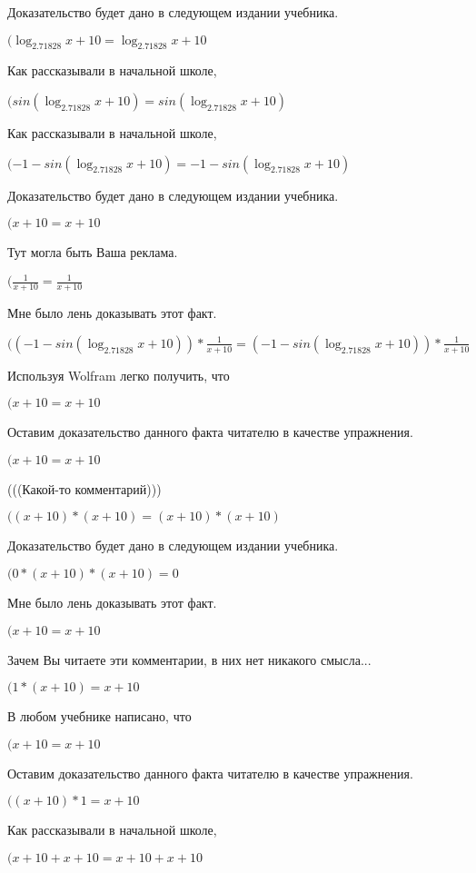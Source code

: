 \documentclass[12pt,a4paper,fleqn]{article}
\theoremstyle{definition}
\begin{document}
Доказательство будет дано в следующем издании учебника.

$(\log_{ 2.71828 }{ x  +  10 } = \log_{ 2.71828 }{ x  +  10 }$

Как рассказывали в начальной школе,

$(sin(\log_{ 2.71828 }{ x  +  10 }) = sin(\log_{ 2.71828 }{ x  +  10 })$

Как рассказывали в начальной школе,

$( -1  - sin(\log_{ 2.71828 }{ x  +  10 }) =  -1  - sin(\log_{ 2.71828 }{ x  +  10 })$

Доказательство будет дано в следующем издании учебника.

$( x  +  10  =  x  +  10 $

Тут могла быть Ваша реклама.

$(\frac{ 1 }{ x  +  10 }
 = \frac{ 1 }{ x  +  10 }
$

Мне было лень доказывать этот факт.

$(( -1  - sin(\log_{ 2.71828 }{ x  +  10 })) * \frac{ 1 }{ x  +  10 }
 = ( -1  - sin(\log_{ 2.71828 }{ x  +  10 })) * \frac{ 1 }{ x  +  10 }
$

Используя Wolfram легко получить, что

$( x  +  10  =  x  +  10 $

Оставим доказательство данного факта читателю в качестве упражнения.

$( x  +  10  =  x  +  10 $

(((Какой-то комментарий)))

$(( x  +  10 ) * ( x  +  10 ) = ( x  +  10 ) * ( x  +  10 )$

Доказательство будет дано в следующем издании учебника.

$( 0  * ( x  +  10 ) * ( x  +  10 ) =  0 $

Мне было лень доказывать этот факт.

$( x  +  10  =  x  +  10 $

Зачем Вы читаете эти комментарии, в них нет никакого смысла...

$( 1  * ( x  +  10 ) =  x  +  10 $

В любом учебнике написано, что

$( x  +  10  =  x  +  10 $

Оставим доказательство данного факта читателю в качестве упражнения.

$(( x  +  10 ) *  1  =  x  +  10 $

Как рассказывали в начальной школе,

$( x  +  10  +  x  +  10  =  x  +  10  +  x  +  10 $
\end{document}
